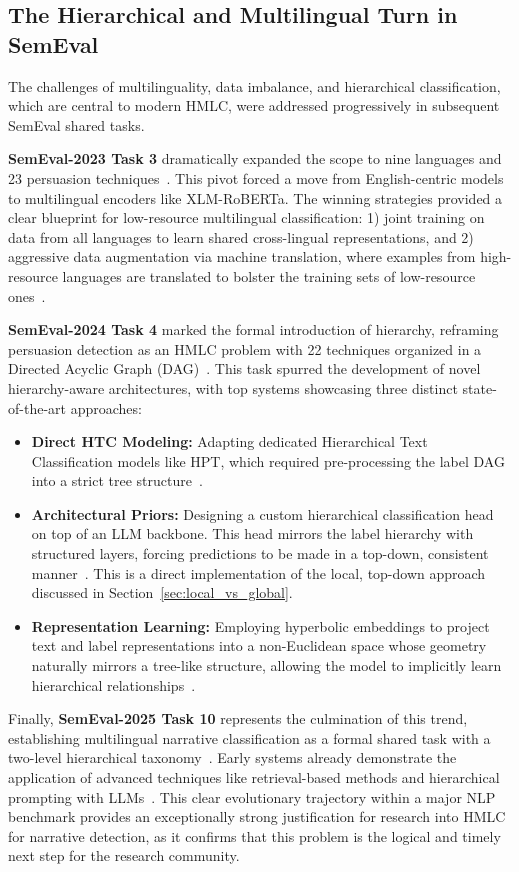 \subsection{The Hierarchical and Multilingual Turn in SemEval}
The challenges of multilinguality, data imbalance, and hierarchical classification, which are central to modern HMLC, were addressed progressively in subsequent SemEval shared tasks.

\textbf{SemEval-2023 Task 3} dramatically expanded the scope to nine languages and 23 persuasion techniques~\cite{SemEval2023Task3}. This pivot forced a move from English-centric models to multilingual encoders like XLM-RoBERTa. The winning strategies provided a clear blueprint for low-resource multilingual classification: 1) joint training on data from all languages to learn shared cross-lingual representations, and 2) aggressive data augmentation via machine translation, where examples from high-resource languages are translated to bolster the training sets of low-resource ones~\cite{hromadka-etal-2023-kinitveraai, modzelewski-etal-2023-dshacker}.

\textbf{SemEval-2024 Task 4} marked the formal introduction of hierarchy, reframing persuasion detection as an HMLC problem with 22 techniques organized in a Directed Acyclic Graph (DAG)~\cite{SemEval2024Task4}. This task spurred the development of novel hierarchy-aware architectures, with top systems showcasing three distinct state-of-the-art approaches:
\begin{itemize}
    \item \textbf{Direct HTC Modeling:} Adapting dedicated Hierarchical Text Classification models like HPT, which required pre-processing the label DAG into a strict tree structure~\cite{HierarchyEverywhere2024}.
    \item \textbf{Architectural Priors:} Designing a custom hierarchical classification head on top of an LLM backbone. This head mirrors the label hierarchy with structured layers, forcing predictions to be made in a top-down, consistent manner~\cite{wunderle-etal-2024-otterlyobsessedwithsemantics}. This is a direct implementation of the local, top-down approach discussed in Section~\ref{sec:local_vs_global}.
    \item \textbf{Representation Learning:} Employing hyperbolic embeddings to project text and label representations into a non-Euclidean space whose geometry naturally mirrors a tree-like structure, allowing the model to implicitly learn hierarchical relationships~\cite{chikoti-etal-2024-iitk}.
\end{itemize}

Finally, \textbf{SemEval-2025 Task 10} represents the culmination of this trend, establishing multilingual narrative classification as a formal shared task with a two-level hierarchical taxonomy~\cite{semeval2025task10}. Early systems already demonstrate the application of advanced techniques like retrieval-based methods and hierarchical prompting with LLMs~\cite{younus-qureshi-2025-nlptuducd, singh-etal-2025-gatenlp}. This clear evolutionary trajectory within a major NLP benchmark provides an exceptionally strong justification for research into HMLC for narrative detection, as it confirms that this problem is the logical and timely next step for the research community.